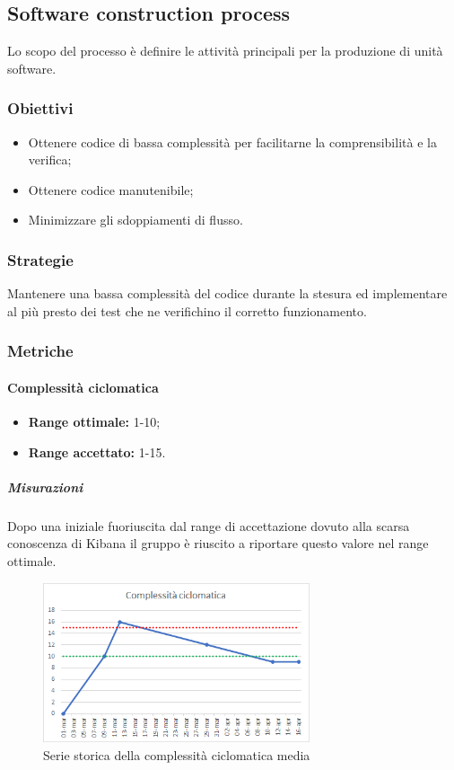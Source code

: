 	\subsection{Software construction process}
	\label{sub:qdp2}
	Lo scopo del processo è definire le attività principali per la produzione di unità software.
		\subsubsection{Obiettivi}
		\begin{itemize}
			\item Ottenere codice di bassa complessità per facilitarne la comprensibilità e la verifica;
			\item Ottenere codice manutenibile;
			\item Minimizzare gli sdoppiamenti di flusso.
		\end{itemize}
		\subsubsection{Strategie}
		Mantenere una bassa complessità del codice durante la stesura ed implementare al più presto dei test che ne verifichino il corretto funzionamento.
		\subsubsection{Metriche}
			\paragraph{Complessità ciclomatica} \Spazio
			\begin{itemize}
				\item \textbf{Range ottimale:} 1-10;
				\item \textbf{Range accettato:} 1-15.
			\end{itemize}
		    \subparagraph{Misurazioni}
		    Dopo una iniziale fuoriuscita dal range di accettazione dovuto alla scarsa conoscenza di Kibana il gruppo è riuscito a riportare questo valore nel range ottimale.
		    \begin{figure}[H]
		    	\centering 
		    	\includegraphics[width=0.7\textwidth]{Images/ciclo.png}
		    	\caption{Serie storica della complessità ciclomatica media}
		    	\label{ciclo} 
		    \end{figure}
	        
